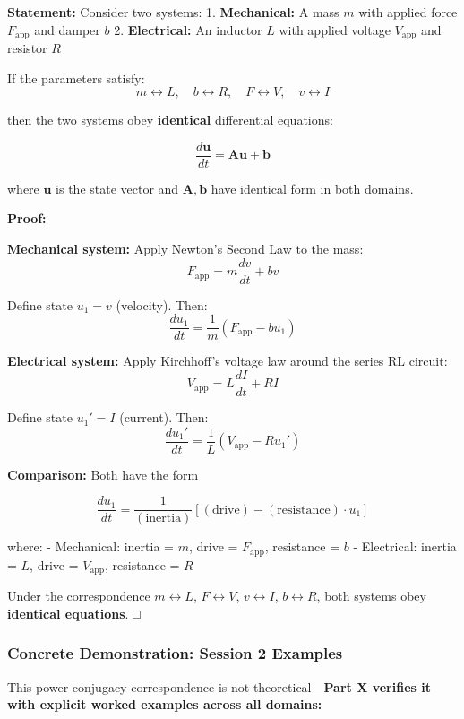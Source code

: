 \documentclass[
]{article}
\begin{document}
\textbf{Statement:} Consider two systems: 1. \textbf{Mechanical:} A mass
\(m\) with applied force \(F_{\text{app}}\) and damper \(b\) 2.
\textbf{Electrical:} An inductor \(L\) with applied voltage
\(V_{\text{app}}\) and resistor \(R\)

If the parameters satisfy:
\[m \leftrightarrow L, \quad b \leftrightarrow R, \quad F \leftrightarrow V, \quad v \leftrightarrow I\]

then the two systems obey \textbf{identical} differential equations:

\[\frac{d\mathbf{u}}{dt} = \mathbf{A} \mathbf{u} + \mathbf{b}\]

where \(\mathbf{u}\) is the state vector and \(\mathbf{A}, \mathbf{b}\)
have identical form in both domains.

\textbf{Proof:}

\textbf{Mechanical system:} Apply Newton's Second Law to the mass:
\[F_{\text{app}} = m\frac{dv}{dt} + bv\]

Define state \(u_1 = v\) (velocity). Then:
\[\frac{du_1}{dt} = \frac{1}{m}(F_{\text{app}} - bu_1)\]

\textbf{Electrical system:} Apply Kirchhoff's voltage law around the
series RL circuit: \[V_{\text{app}} = L\frac{dI}{dt} + RI\]

Define state \(u_1' = I\) (current). Then:
\[\frac{du_1'}{dt} = \frac{1}{L}(V_{\text{app}} - Ru_1')\]

\textbf{Comparison:} Both have the form

\[\frac{du_1}{dt} = \frac{1}{(\text{inertia})}\left[(\text{drive}) - (\text{resistance}) \cdot u_1\right]\]

where: - Mechanical: inertia = \(m\), drive = \(F_{\text{app}}\),
resistance = \(b\) - Electrical: inertia = \(L\), drive =
\(V_{\text{app}}\), resistance = \(R\)

Under the correspondence \(m \leftrightarrow L\),
\(F \leftrightarrow V\), \(v \leftrightarrow I\),
\(b \leftrightarrow R\), both systems obey \textbf{identical equations}.
□

\subsubsection{Concrete Demonstration: Session 2
Examples}\label{concrete-demonstration-session-2-examples}

This power-conjugacy correspondence is not theoretical---\textbf{Part X
verifies it with explicit worked examples across all domains:}
\end{document}
